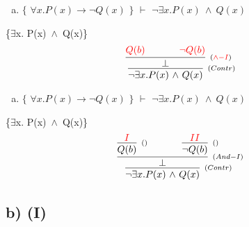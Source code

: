 \documentclass[aspectratio=43]{beamer}
\newcommand{\ex}{$\exists$}
\newcommand{\nao}{$\neg$}
\newcommand{\nex}{\nao\ex}
\newcommand{\andd}{$\wedge$}
\begin{document}
    \begin{frame}[fragile]
    	
    	\begin{enumerate}[b)]
			
			\item $\{$ $\forall x.P(x)\to \neg Q(x)$ $\}$ $\vdash$ $ \neg\exists  x.P(x)\ \wedge\ Q(x)$ \\ 
			
		\end{enumerate}
        \{\ex  x. P(x)\ \andd\ Q(x)\}
        \vspace{95pt}
        \[
        \begin{array}{c}
		
        	\infer[_{(Contr)}]
            {$\nex$  x. P(x)\ $\andd$\ Q(x)}
            {\infer[_{(\textcolor{red}{\land-I})}] 
            	{\bot}
                { \textcolor{red}{ Q(b) \hspace{35pt} \neg Q(b)}}
        	}
		\end{array}
        \]
        
	\end{frame}
    
    \begin{frame}[fragile]
    	
    	\begin{enumerate}[b)]
			
			\item $\{$ $\forall x.P(x)\to \neg Q(x)$ $\}$ $\vdash$ $ \neg\exists  x.P(x)\ \wedge\ Q(x)$ \\ 
			
		\end{enumerate}
        \{\ex  x. P(x)\ \andd\ Q(x)\}
        \vspace{100pt}
        \[
        \begin{array}{c}
		
        	\infer[_{(Contr)}]
            {$\nex$  x. P(x)\ $\andd$\ Q(x)}
            {\infer[_{(And-I)}] 
            	{\bot}
                {\infer[_{()}]
                	{Q(b)}
                    {\textcolor{red}{I}}
                \hspace{35pt} 
                \infer[_{()}]
                	{$\nao$Q(b)}
                    {\textcolor{red}{II}}
                }
        	}
		\end{array}
        \]
        
	\end{frame}
    
    \subsection{b) (I)}
    
\end{document}
